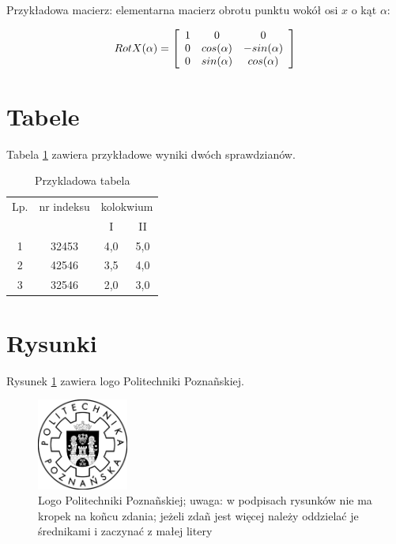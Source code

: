 Przykładowa macierz: elementarna macierz obrotu punktu wokół osi $x$ o kąt $\alpha$:

$$RotX(\alpha) = \left[ \begin{array}{c c c} 
1 & 0 & 0 \\
0 & cos(\alpha) & -sin(\alpha) \\ 
0 & sin(\alpha) & cos(\alpha)
\end{array} \right] $$

\section{Tabele}
\label{sec:tresc:tab}

Tabela \ref{tab1} zawiera przykładowe wyniki dwóch sprawdzianów.

\begin{table}[h]
	\begin{center}
	\caption{Przykladowa tabela}
	\label{tab1}
	\begin{tabular}{|c|c|c|c|}
		\hline
		Lp.& nr indeksu & \multicolumn{2}{|c|}{kolokwium}\\ \cline{3-4}
		   &            & I   & II \\ \hline
		1  & 32453      & 4,0  & 5,0\\
		2  & 42546      & 3,5  & 4,0\\
		3  & 32546      & 2,0  & 3,0\\ \hline
	\end{tabular}
	\end{center}
\end{table}

\section{Rysunki}
\label{sec:tresc:rys}

Rysunek \ref{fig:rys1} zawiera logo Politechniki Poznañskiej.\\

\begin{figure}[h]
	\begin{center}
		\includegraphics[height = 3cm]{figures/template/logo-pp}
		\caption[Logo Politechniki Poznañskiej]{Logo Politechniki Poznañskiej; uwaga: w podpisach rysunków nie ma kropek na koñcu zdania; jeżeli zdañ jest więcej należy oddzielać je średnikami i zaczynać z małej litery}

		\label{fig:rys1}
	\end{center}
\end{figure}

